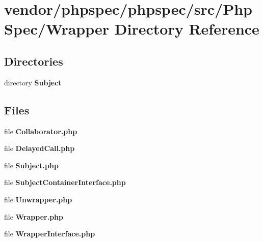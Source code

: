 \section{vendor/phpspec/phpspec/src/\+Php\+Spec/\+Wrapper Directory Reference}
\label{dir_f94afce852ef6cc13c140153f82aece0}
\subsection*{Directories}
\begin{DoxyCompactItemize}
\item 
directory {\bf Subject}
\end{DoxyCompactItemize}
\subsection*{Files}
\begin{DoxyCompactItemize}
\item 
file {\bf Collaborator.\+php}
\item 
file {\bf Delayed\+Call.\+php}
\item 
file {\bf Subject.\+php}
\item 
file {\bf Subject\+Container\+Interface.\+php}
\item 
file {\bf Unwrapper.\+php}
\item 
file {\bf Wrapper.\+php}
\item 
file {\bf Wrapper\+Interface.\+php}
\end{DoxyCompactItemize}
